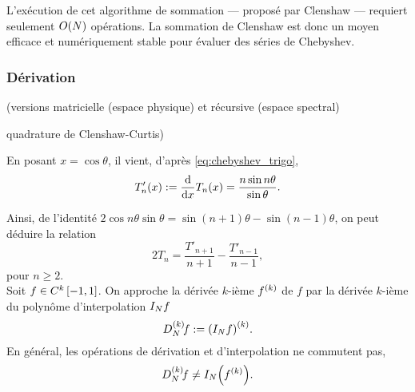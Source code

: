 L'exécution de cet algorithme de sommation --- proposé par Clenshaw \cite{clenshaw1955} --- requiert seulement $\bigO{N}$ opérations. %
La sommation de Clenshaw est donc un moyen efficace et numériquement stable pour évaluer des séries de Chebyshev.

\subsubsection{Dérivation}
(versions matricielle (espace physique) et récursive (espace spectral)\par
quadrature de Clenshaw-Curtis)\par

En posant $x = \cos\theta$, il vient, d'après \eqref{eq:chebyshev_trigo},
\begin{equation}
	T_n'(x) := \dfdx{T_n(x)}{x} = \frac{n \sin n\theta}{\sin \theta}.
\end{equation}

Ainsi, de l'identité $2 \cos n \theta \sin \theta = \sin(n+1)\theta - \sin(n-1)\theta$, on peut déduire la relation 
\begin{equation}
	2 T_n = \frac{T'_{n+1}}{n+1} - \frac{T'_{n-1}}{n-1} ,
	\label{eq:chebyshev_relation_deriv_3termes}
\end{equation}
pour $n \geq 2$.
\\
Soit $f \in \contdiff{k}\chebinterval$.
On approche la dérivée $k$-ième $\deriv{f}{k}$ de $f$ par la dérivée $k$-ième du polynôme d'interpolation $\interpolant{f}{N}$
\begin{equation}
	\interpderiv{f}{N}{k} := \deriv{ \left( \interpolant{f}{N} \right) }{k}.
	\label{eq:chebyshev_def_interpderiv}
\end{equation}
En général, les opérations de dérivation et d'interpolation ne commutent pas, \ie
\begin{equation}
	\interpderiv{f}{N}{k} \neq \interpolant{ \left( \deriv{f}{k} \right) }{N}.
\end{equation}

